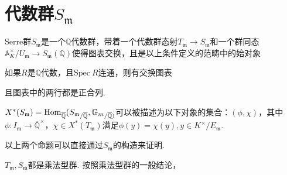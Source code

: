 \section{代数群\texorpdfstring{$S_{\mathfrak{m}}$}{Sm}}

\begin{cdef}
    Serre群$S_{\mathfrak{m}}$是一个$\mathbb{Q}$代数群，带着一个代数群态射$T_{\mathfrak{m}}\to S_{\mathfrak{m}}$和一个群同态$\mathbb{A}_K^{\times}/U_{\mathfrak{m}}\to S_{\mathfrak{m}}(\mathbb{Q})$使得图表交换，且是以上条件定义的范畴中的始对象
    \begin{figure}[H]
        \centering
    \end{figure}
\end{cdef}

\begin{cprop}
    如果$R$是$\mathbb{Q}$代数，且$\mathrm{Spec}\ R$连通，则有交换图表
    \begin{figure}[H]
        \centering
    \end{figure}
    且图表中的两行都是正合列.
\end{cprop}

\begin{cprop}
    $X^{*}(S_{\mathfrak{m}}) = \mathrm{Hom}_{\overline{\mathbb{Q}}}({S_{\mathfrak{m}}}_{/\overline{\mathbb{Q}}}, {\mathbb{G}_{m}}_{/\overline{\mathbb{Q}})}$可以被描述为以下对象的集合：$(\phi, \chi)$，其中$\phi: I_{\mathfrak{m}}\to \overline{\mathbb{Q}}^{\times}$，$\chi\in X^{*}(T_{\mathfrak{m}})$满足$\phi(y) = \chi(y), y\in K^{\times}/ E_{\mathfrak{m}}$.
\end{cprop}

以上两个命题可以直接通过$S_{\mathfrak{m}}$的构造来证明.

$T_{\mathfrak{m}},S_{\mathfrak{m}}$都是乘法型群. 按照乘法型群的一般结论，


